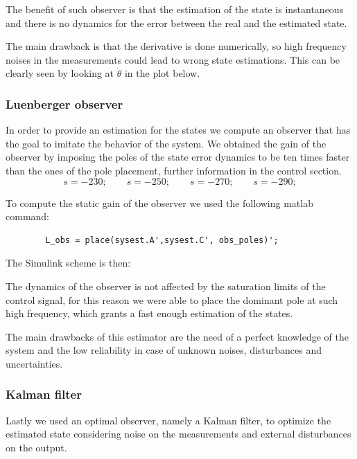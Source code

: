 The benefit of such observer is that the estimation of the state is instantaneous and there is no dynamics for the error between the real and the estimated state.

The main drawback is that the derivative is done numerically, so high frequency noises in the measurements could lead to wrong state estimations.
This can be clearly seen by looking at $\dot\theta$ in the plot below. 


\subsubsection{Luenberger observer}

    In order to provide an estimation for the states we compute an observer that has the goal to imitate the behavior of the system. We obtained the gain of the observer by imposing the poles of the state error dynamics to be ten times faster than the ones of the pole placement, further information in the control section.
                \[
                    s = -230; \qquad s = -250; \qquad s=-270; \qquad s=-290;\]

                To compute the static gain of the observer we used the following matlab command:
\begin{verbatim}
        L_obs = place(sysest.A',sysest.C', obs_poles)';
\end{verbatim}
                
                The Simulink scheme is then:


                The dynamics of the observer is not affected by the saturation limits of the control signal, for this reason we were able to place the dominant pole at such high frequency, which grants a fast enough estimation of the states.
                
                The main drawbacks of this estimator are the need of a perfect knowledge of the system and the low reliability in case of unknown noises, disturbances and uncertainties.

            \subsubsection{Kalman filter}

                Lastly we used an optimal observer, namely a Kalman filter, to optimize the estimated state considering noise on the measurements and external disturbances on the output. 

